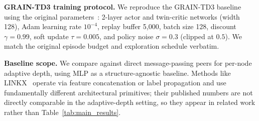 \documentclass[letterpaper]{article}
\begin{document}
\noindent\textbf{GRAIN-TD3 training protocol.}\;
We reproduce the GRAIN-TD3 baseline using the original parameters~\cite{grain2025}: 2-layer actor and twin-critic networks (width 128), Adam learning rate $10^{-4}$, replay buffer 5{,}000, batch size 128, discount $\gamma=0.99$, soft update $\tau=0.005$, and policy noise $\sigma=0.3$ (clipped at $0.5$). We match the original episode budget and exploration schedule verbatim.

\noindent\textbf{Baseline scope.}\;
We compare against direct message-passing peers for per-node adaptive depth, using MLP as a structure-agnostic baseline. Methods like LINKX~\cite{linkx2021} operate via feature concatenation or label propagation and use fundamentally different architectural primitives; their published numbers are not directly comparable in the adaptive-depth setting, so they appear in related work rather than Table~\ref{tab:main_results}.
\end{document}
